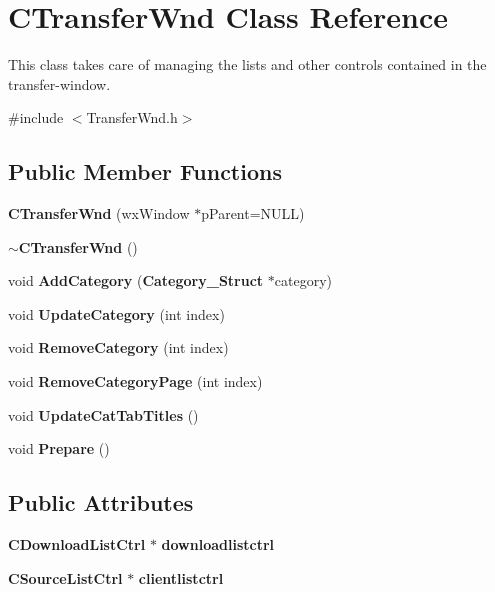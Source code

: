 \section{CTransferWnd Class Reference}
\label{classCTransferWnd}


This class takes care of managing the lists and other controls contained in the transfer-\/window.  


{\ttfamily \#include $<$TransferWnd.h$>$}\subsection*{Public Member Functions}
\begin{DoxyCompactItemize}
\item 
{\bf CTransferWnd} (wxWindow $\ast$pParent=NULL)\label{classCTransferWnd_aa2d07856511d7b2be468d211a3ae40b2}

\item 
{\bf $\sim$CTransferWnd} ()\label{classCTransferWnd_a08067e39e0da2fd6032a1245e342ff4d}

\item 
void {\bf AddCategory} ({\bf Category\_\-Struct} $\ast$category)
\item 
void {\bf UpdateCategory} (int index)
\item 
void {\bf RemoveCategory} (int index)\label{classCTransferWnd_ad54d38d55abc70c0df080ef63ae429f6}

\item 
void {\bfseries RemoveCategoryPage} (int index)\label{classCTransferWnd_abdea87a4a7570407536d41df3ec0c699}

\item 
void {\bf UpdateCatTabTitles} ()\label{classCTransferWnd_ae2da6bee2be6d25842dc65d39d2b1bce}

\item 
void {\bf Prepare} ()
\end{DoxyCompactItemize}
\subsection*{Public Attributes}
\begin{DoxyCompactItemize}
\item 
{\bf CDownloadListCtrl} $\ast$ {\bf downloadlistctrl}\label{classCTransferWnd_ae88ecea82c9b6b0634af2b2b416dabcc}

\item 
{\bf CSourceListCtrl} $\ast$ {\bf clientlistctrl}\label{classCTransferWnd_a6fbc1afe83305094b677ff99bde7eab4}

\end{DoxyCompactItemize}

